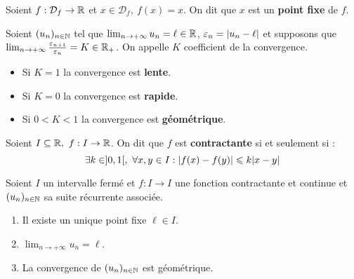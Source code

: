 \begin{definition}
	Soient $f : \mathcal{D}_f \to \mathbb{R}$ et $x \in \mathcal{D}_f,\ f(x) = x$. On dit que $x$ est un \textbf{point fixe} de $f$.
\end{definition}

\begin{definition}
    Soient $(u_n)_{n \in \mathbb{N}}$ tel que $\lim_{n \to +\infty} u_n = \ell \in \mathbb{R}$, $\varepsilon_n = \abs{u_n - \ell}$ et supposons que $\lim_{n \to +\infty} \frac{\varepsilon_{n + 1}}{\varepsilon_n} = K \in \mathbb{R}_+$. 
    On appelle $K$ coefficient de la convergence.
    \begin{itemize}
        \item Si $K = 1$ la convergence est \textbf{lente}.
        \item Si $K = 0$ la convergence est \textbf{rapide}.
        \item Si $0 < K < 1$ la convergence est \textbf{géométrique}.
    \end{itemize}
\end{definition}

\begin{definition}
	Soient $I \subseteq \mathbb{R},\ f : I \to \mathbb{R}$.
    On dit que $f$ est \textbf{contractante} si et seulement si :
    \[ \exists k \in ]0, 1[,\ \forall x, y \in I : \abs{f(x) - f(y)} \leqslant k \abs{x - y} \]
\end{definition}

\begin{theorem}
	Soient $I$ un intervalle fermé et $f : I \to I$ une fonction contractante et continue et $(u_n)_{n \in \mathbb{N}}$ sa suite récurrente associée.
	\begin{enumerate}
        \item Il existe un unique point fixe $\ell \in I$.
        \item $\lim_{n \to +\infty} u_n = \ell$.
        \item La convergence de $(u_n)_{n \in \mathbb{N}}$ est géométrique.
    \end{enumerate}
\end{theorem}

